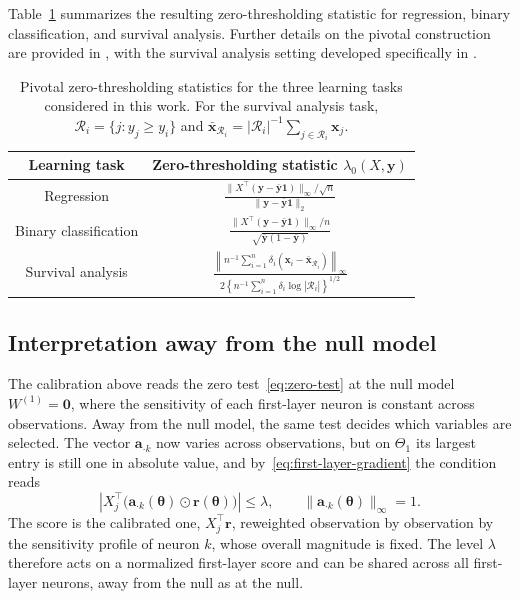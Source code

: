 \documentclass[twoside,11pt]{article}
\newcommand{\bth}{\boldsymbol{\theta}}
\newcommand{\ba}{\mathbf{a}}
\newcommand{\br}{\mathbf{r}}
\newcommand{\bx}{\mathbf{x}}
\newcommand{\by}{\mathbf{y}}
\newcommand{\bone}{\mathbf{1}}
\newcommand{\Wone}{W^{(1)}}
\newcommand{\Thetaone}{\Theta_{1}}
\begin{document}
Table~\ref{tab:pivotal-ztf} summarizes the resulting zero-thresholding statistic for regression, binary classification, and survival analysis. Further details on the pivotal construction are provided in \citet{PIC-SMS2026}, with the survival analysis setting developed specifically in \citet{COX-MS2026}.

\begin{table}[t]
    \centering
    \begin{tabular}{c|c}
        \textbf{Learning task} & \textbf{Zero-thresholding statistic $\lambda_0(X,\by)$} \\
        \hline
        Regression & $\frac{\|X^\top(\by -\bar{\by}\bone)\|_\infty/\sqrt{n}}{\|\by -\bar{\by}\bone\|_2}$ \\
        Binary classification & $\frac{\|X^\top(\by -\bar{\by}\bone)\|_\infty/n}{\sqrt{\bar{\by}(1-\bar{\by})}}$ \\
        Survival analysis & $\frac{
        \left\|
        n^{-1}\sum_{i=1}^n
        \delta_i(\bx_i-\bar{\bx}_{\mathcal R_i})
        \right\|_\infty
        }{
        2\left\{
        n^{-1}\sum_{i=1}^n
        \delta_i\log|\mathcal R_i|
        \right\}^{1/2}
        }$
    \end{tabular}
    \caption{Pivotal zero-thresholding statistics for the three learning tasks considered in this work. For the survival analysis task, $\mathcal R_i=\{j:y_j\geq y_i\}$ and $\bar{\bx}_{\mathcal R_i}=|\mathcal R_i|^{-1}\sum_{j\in\mathcal R_i}\bx_j$.}
    \label{tab:pivotal-ztf}
\end{table}

\subsection{Interpretation away from the null model}
\label{sec:lambda-away-null}

The calibration above reads the zero test~\eqref{eq:zero-test} at the null model $\Wone=\mathbf 0$, where the sensitivity of each first-layer neuron is constant across observations. Away from the null model, the same test decides which variables are selected. The vector $\ba_{\cdot k}$ now varies across observations, but on $\Thetaone$ its largest entry is still one in absolute value, and by~\eqref{eq:first-layer-gradient} the condition reads
\begin{equation*}
    \left|X_j^\top\big(\ba_{\cdot k}(\bth)\odot\br(\bth)\big)\right|\leq\lambda,
    \qquad \|\ba_{\cdot k}(\bth)\|_\infty=1 .
\end{equation*}
The score is the calibrated one, $X_j^\top\br$, reweighted observation by observation by the sensitivity profile of neuron $k$, whose overall magnitude is fixed. The level $\lambda$ therefore acts on a normalized first-layer score and can be shared across all first-layer neurons, away from the null as at the null.
\end{document}

